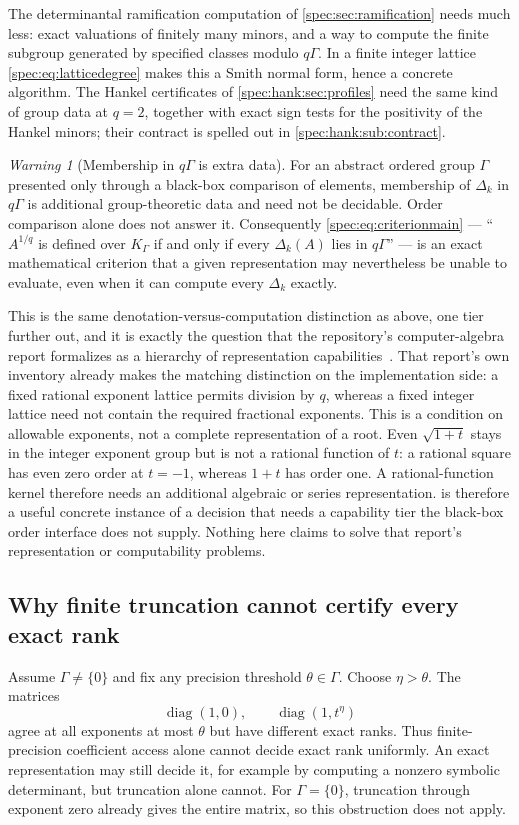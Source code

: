 \documentclass[11pt,a4paper]{article}
\numberwithin{equation}{section}
\theoremstyle{definition}
\theoremstyle{remark}
\newtheorem{warning}[warning]{Warning}
\newcommand{\diag}{\operatorname{diag}}
\begin{document}
The determinantal ramification computation of \cref{spec:sec:ramification}
needs much less: exact valuations of finitely many minors, and a way to
compute the finite subgroup generated by specified classes modulo
$q\Gamma$. In a finite integer lattice \eqref{spec:eq:latticedegree} makes
this a Smith normal form, hence a concrete algorithm. The Hankel certificates
of \cref{spec:hank:sec:profiles} need the same kind of group data at $q=2$,
together with exact sign tests for the positivity of the Hankel minors; their
contract is spelled out in \cref{spec:hank:sub:contract}.

\begin{warning}[Membership in $q\Gamma$ is extra data]\label{spec:warn:qgamma}
For an abstract ordered group $\Gamma$ presented only through a black-box
comparison of elements, membership of $\Delta_k$ in $q\Gamma$ is additional
group-theoretic data and need not be decidable. Order comparison alone does
not answer it. Consequently
\eqref{spec:eq:criterionmain} --- ``$A^{1/q}$ is defined over $K_\Gamma$ if
and only if every $\Delta_k(A)$ lies in $q\Gamma$'' --- is an exact
mathematical criterion that a given representation may nevertheless be
unable to evaluate, even when it can compute every $\Delta_k$ exactly.
\end{warning}

This is the same denotation-versus-computation distinction as above, one
tier further out, and it is exactly the question that the repository's
computer-algebra report formalizes as a hierarchy of representation
capabilities~\cite{RepoCAS}. That report's own inventory already makes the
matching distinction on the implementation side: a fixed rational exponent
lattice permits division by $q$, whereas a fixed integer lattice need not
contain the required fractional exponents. This is a condition on allowable
exponents, not a complete representation of a root. Even
$\sqrt{1+t}$ stays in the integer exponent group but is not a rational
function of $t$: a rational square has even zero order at $t=-1$, whereas
$1+t$ has order one. A rational-function kernel therefore needs an additional
algebraic or series representation.  is therefore a useful concrete
instance of a decision that needs a capability tier the black-box order
interface does not supply. Nothing here claims to solve that report's
representation or computability problems.

\subsection{Why finite truncation cannot certify every exact rank}
Assume $\Gamma\ne\{0\}$ and fix any precision threshold $\theta\in\Gamma$.
Choose $\eta>\theta$. The matrices
\[
 \diag(1,0),\qquad \diag(1,t^\eta)
\]
agree at all exponents at most $\theta$ but have different exact ranks.
Thus finite-precision coefficient access alone cannot decide exact rank
uniformly. An exact representation may still decide it, for example by
computing a nonzero symbolic determinant, but truncation alone cannot.
For $\Gamma=\{0\}$, truncation through exponent zero already gives the
entire matrix, so this obstruction does not apply.
\end{document}

